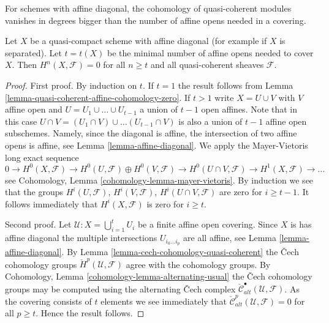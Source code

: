 \begin{lemma}
\label{lemma-vanishing-nr-affines}
\begin{slogan}
For schemes with affine diagonal, the cohomology of quasi-coherent
modules vanishes in degrees bigger than the number of affine
opens needed in a covering.
\end{slogan}
Let $X$ be a quasi-compact scheme with affine diagonal (for example
if $X$ is separated).
Let $t = t(X)$ be the minimal number of affine opens needed to
cover $X$. Then $H^n(X, \mathcal{F}) = 0$ for all $n \geq t$ and all
quasi-coherent sheaves $\mathcal{F}$.
\end{lemma}

\begin{proof}
First proof.
By induction on $t$.
If $t = 1$ the result follows from
Lemma \ref{lemma-quasi-coherent-affine-cohomology-zero}.
If $t > 1$ write $X = U \cup V$ with $V$ affine open and
$U = U_1 \cup \ldots \cup U_{t - 1}$ a union of $t - 1$ open affines.
Note that in this case
$U \cap V =  (U_1 \cap V) \cup \ldots (U_{t - 1} \cap V)$
is also a union of $t - 1$ affine open subschemes.
Namely, since the diagonal is affine, the intersection of two
affine opens is affine, see Lemma \ref{lemma-affine-diagonal}.
We apply the Mayer-Vietoris long exact sequence
$$
0 \to
H^0(X, \mathcal{F}) \to
H^0(U, \mathcal{F}) \oplus H^0(V, \mathcal{F}) \to
H^0(U \cap V, \mathcal{F}) \to
H^1(X, \mathcal{F}) \to \ldots
$$
see Cohomology, Lemma \ref{cohomology-lemma-mayer-vietoris}.
By induction we see that the groups $H^i(U, \mathcal{F})$,
$H^i(V, \mathcal{F})$, $H^i(U \cap V, \mathcal{F})$ are zero for
$i \geq t - 1$. It follows immediately that $H^i(X, \mathcal{F})$
is zero for $i \geq t$.

\medskip\noindent
Second proof.
Let $\mathcal{U} : X = \bigcup_{i = 1}^t U_i$ be a finite affine open
covering. Since $X$ is has affine diagonal the multiple intersections
$U_{i_0 \ldots i_p}$ are all affine, see
Lemma \ref{lemma-affine-diagonal}.
By Lemma \ref{lemma-cech-cohomology-quasi-coherent} the {\v C}ech
cohomology groups $\check{H}^p(\mathcal{U}, \mathcal{F})$
agree with the cohomology groups. By
Cohomology, Lemma \ref{cohomology-lemma-alternating-usual}
the {\v C}ech cohomology groups may be computed using the alternating
{\v C}ech complex $\check{\mathcal{C}}_{alt}^\bullet(\mathcal{U}, \mathcal{F})$.
As the covering consists of $t$ elements we see immediately
that $\check{\mathcal{C}}_{alt}^p(\mathcal{U}, \mathcal{F}) = 0$
for all $p \geq t$. Hence the result follows.
\end{proof}

